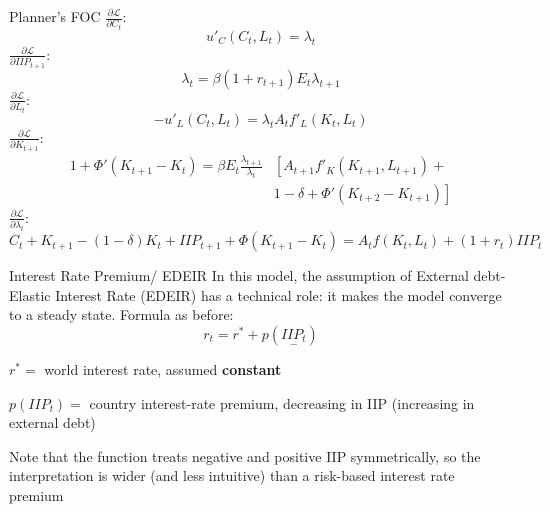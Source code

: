 \documentclass{beamer}
\newenvironment{mytemize}
{\vfill\itemize[nolistsep,itemsep=\fill,label=\color{blue}{$\triangleright$}]}
  {\enditemize}
\begin{document}
\begin{frame}{Planner's FOC}
  $\frac{\partial \mathcal L}{\partial C_t}$:
\begin{equation*}
\label{eq:soe-rbc-foc-c-edeir}
 u'_C(C_t,L_t)
= \lambda_t 
\end{equation*}
$\frac{\partial \mathcal L}{\partial IIP_{t+1}}$:
\begin{equation*}
\label{eq:soe-rbc-foc-d-edeir}
\lambda_t = \beta (1+r_{t+1})E_t\lambda_{t+1}
\end{equation*}
$\frac{\partial \mathcal L}{\partial L_{t}}$:
\begin{equation*}
\label{eq:soe-rbc-foc-h-edeir}
-u'_L(C_t,L_t) = \lambda_tA_t f'_L(K_t,L_t)
\end{equation*}
$\frac{\partial \mathcal L}{\partial K_{t+1}}$:
\begin{align*}
\label{eq:soe-rbc-foc-k-edeir}
1+\Phi'(K_{t+1}-K_t)
= \beta
E_t \frac{\lambda_{t+1}}{\lambda_t }
&\left[
A_{t+1}f'_K(K_{t+1},L_{t+1})
+ \right.\\ &\left.1-\delta + \Phi'(K_{t+2}-K_{t+1})
\right]
\end{align*}
$\frac{\partial \mathcal L}{\partial \lambda_t}$:
\begin{equation*}
\label{eq:soe-rbc-bc-combined-edeir}
C_t + K_{t+1}-(1-\delta)K_t+ IIP_{t+1}+\Phi(K_{t+1}-K_t) 
= A_t f(K_t,L_t)+ (1+r_t)IIP_t
\end{equation*}
 
\end{frame}

\begin{frame}{Interest Rate Premium/ EDEIR}
  In this model, the assumption of External debt-Elastic Interest Rate (EDEIR) has a technical role: it makes the model converge to a steady state. 
Formula as before:
\begin{equation*}
\label{eq:soe-rbc-r-edeir}
r_t = r^* + p(\underset{-}{IIP_t})
\end{equation*}
\begin{mytemize}
\item $r^*=$ world interest rate, assumed  \textbf{constant}\\
\item $p(IIP_t)=$  country interest-rate premium, decreasing in IIP (increasing in external debt)
  \begin{mytemize}
  \item Note that the function treats negative and positive IIP symmetrically, so the interpretation is wider (and less intuitive) than a risk-based interest rate premium 
  \end{mytemize}
\end{mytemize}

\end{frame}
\end{document}
